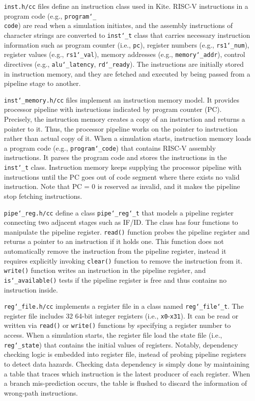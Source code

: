 \documentclass[10pt]{article}
\begin{document}
{\tt inst.h/cc} files define an instruction class used in Kite.
RISC-V instructions in a program code (e.g., {\tt program\char`_\\ code}) are read when a simulation initiates, and the assembly instructions of character strings are converted to {\tt inst\char`_t} class that carries necessary instruction information such as program counter (i.e., {\tt pc}), register numbers (e.g., {\tt rs1\char`_num}), register values (e.g., {\tt rs1\char`_val}), memory addresses (e.g., {\tt memory\char`_addr}), control directives (e.g., {\tt alu\char`_latency}, {\tt rd\char`_ready}).
The instructions are initially stored in instruction memory, and they are fetched and executed by being passed from a pipeline stage to another.

{\tt inst\char`_memory.h/cc} files implement an instruction memory model.
It provides processor pipeline with instructions indicated by program counter (PC).
Precisely, the instruction memory creates a copy of an instruction and returns a pointer to it.
Thus, the processor pipeline works on the pointer to instruction rather than actual copy of it.
When a simulation starts, instruction memory loads a program code (e.g., {\tt program\char`_code}) that contains RISC-V assembly instructions.
It parses the program code and stores the instructions in the {\tt inst\char`_t} class.
Instruction memory keeps supplying the processor pipeline with instructions until the PC goes out of code segment where there exists no valid instruction.
Note that PC = 0 is reserved as invalid, and it makes the pipeline stop fetching instructions.

{\tt pipe\char`_reg.h/cc} define a class {\tt pipe\char`_reg\char`_t} that models a pipeline register connecting two adjacent stages such as IF/ID.
The class has four functions to manipulate the pipeline register.
{\tt read()} function probes the pipeline register and returns a pointer to an instruction if it holds one.
This function does not automatically remove the instruction from the pipeline register, instead it requires explicitly invoking {\tt clear()} function to remove the instruction from it.
{\tt write()} function writes an instruction in the pipeline register, and {\tt is\char`_available()} tests if the pipeline register is free and thus contains no instruction inside.

{\tt reg\char`_file.h/cc} implements a register file in a class named {\tt reg\char`_file\char`_t}.
The register file includes 32 64-bit integer registers (i.e., {\tt x0}-{\tt x31}).
It can be read or written via {\tt read()} or {\tt write()} functions by specifying a register number to access.
When a simulation starts, the register file load the state file (i.e., {\tt reg\char`_state}) that contains the initial values of registers.
Notably, dependency checking logic is embedded into register file, instead of probing pipeline registers to detect data hazards.
Checking data dependency is simply done by maintaining a table that traces which instruction is the latest producer of each register.
When a branch mis-prediction occurs, the table is flushed to discard the information of wrong-path instructions.
\end{document}
